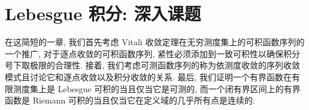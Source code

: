 \documentclass[../main.tex]{subfiles}
\begin{document}
\chapter{Lebesgue 积分: 深入课题}\label{chapter:ch05-深入课题}

在这简短的一章, 我们首先考虑 Vitali 收敛定理在无穷测度集上的可积函数序列的一个推广, 对于逐点收敛的可积函数序列, 紧性必须添加到一致可积性以确保积分号下取极限的合理性. 接着, 我们考虑可测函数序列的称为依测度收敛的序列收敛模式且讨论它和逐点收敛以及积分收敛的关系. 最后, 我们证明一个有界函数在有限测度集上是 Lebesgue 可积的当且仅当它是可测的, 而一个闭有界区间上的有界函数是 Riemann 可积的当且仅当它在定义域的几乎所有点是连续的.






\end{document}
